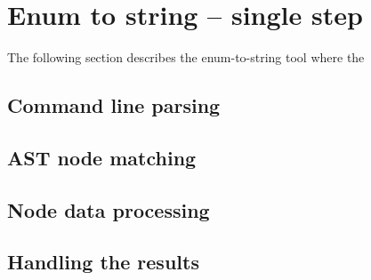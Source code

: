 \section{Enum to string -- single step}
The following section describes the enum-to-string tool where the 

\subsection{Command line parsing}

\subsection{AST node matching}\label{subsec:085tool:enum_node_matching_sin}

\subsection{Node data processing}

\subsection{Handling the results}